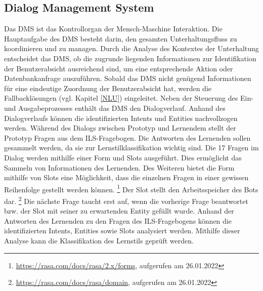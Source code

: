         \subsection{Dialog Management System} \label{DMS}
        Das DMS ist das Kontrollorgan der Mensch-Maschine Interaktion. Die Hauptaufgabe des DMS besteht darin, den gesamten 
        Unterhaltungsfluss zu koordinieren und zu managen. Durch die Analyse des Kontextes der Unterhaltung entscheidet das DMS, ob die zugrunde 
        liegenden Informationen zur Identifikation der Benutzerabsicht ausreichend sind, um eine entsprechende Aktion oder Datenbankanfrage auszuführen.
        Sobald das DMS nicht genügend Informationen für eine eindeutige Zuordnung der Benutzerabsicht hat, werden die Fallbacklösungen (vgl. Kapitel \ref{NLU})
        eingeleitet. 
        Neben der Steuerung des Ein- und Ausgabeprozesses enthält das DMS den Dialogverlauf. \parencite[23 f.]{Kong.2021} \parencite[59 f.]{Sieber.2019}
        Anhand des Dialogverlaufs können die identifizierten Intents und Entities nachvollzogen werden.
        Während des Dialogs zwischen Prototyp und Lernendem stellt der Prototyp Fragen aus dem ILS-Fragebogen. Die Antworten des Lernenden sollen gesammelt werden, da sie zur Lernstilklassifikation wichtig sind.
        Die 17 Fragen im Dialog werden mithilfe einer Form und Slots ausgeführt. Dies ermöglicht das Sammeln von Informationen des Lernenden. Des Weiteren bietet die Form mithilfe von Slots eine Möglichkeit, dass die einzelnen Fragen in einer gewissen Reihenfolge 
        gestellt werden können. \footnote{\url{ https://rasa.com/docs/rasa/2.x/forms}, aufgerufen am 26.01.2022} Der Slot stellt den Arbeitsspeicher des Bots dar. \footnote{\url{ https://rasa.com/docs/rasa/domain}, aufgerufen am 26.01.2022}  
        Die nächste Frage taucht erst auf, wenn die vorherige Frage beantwortet bzw. der Slot mit seiner zu erwartenden Entity gefüllt wurde.
        Anhand der Antworten des Lernenden zu den Fragen des ILS-Fragebogens können die identifizierten Intents, Entities sowie Slots analysiert werden.
        Mithilfe dieser Analyse kann die Klassifikation des Lernstils geprüft werden.
        
